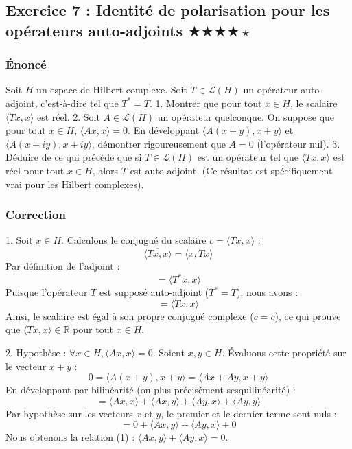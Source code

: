 \documentclass[11pt,a4paper]{article}
\begin{document}
\subsection*{Exercice 7 : Identité de polarisation pour les opérateurs auto-adjoints $\bigstar\bigstar\bigstar\bigstar\star$}
\subsubsection*{Énoncé}
Soit $H$ un espace de Hilbert complexe. Soit $T \in \mathcal{L}(H)$ un opérateur auto-adjoint, c'est-à-dire tel que $T^* = T$.
1. Montrer que pour tout $x \in H$, le scalaire $\langle Tx, x \rangle$ est réel.
2. Soit $A \in \mathcal{L}(H)$ un opérateur quelconque. On suppose que pour tout $x \in H$, $\langle Ax, x \rangle = 0$. En développant $\langle A(x+y), x+y \rangle$ et $\langle A(x+iy), x+iy \rangle$, démontrer rigoureusement que $A = 0$ (l'opérateur nul).
3. Déduire de ce qui précède que si $T \in \mathcal{L}(H)$ est un opérateur tel que $\langle Tx, x \rangle$ est réel pour tout $x \in H$, alors $T$ est auto-adjoint. (Ce résultat est spécifiquement vrai pour les Hilbert complexes).

\subsubsection*{Correction}
1. Soit $x \in H$. Calculons le conjugué du scalaire $c = \langle Tx, x \rangle$ :
$$ \overline{\langle Tx, x \rangle} = \langle x, Tx \rangle $$
Par définition de l'adjoint :
$$ = \langle T^*x, x \rangle $$
Puisque l'opérateur $T$ est supposé auto-adjoint ($T^* = T$), nous avons :
$$ = \langle Tx, x \rangle $$
Ainsi, le scalaire est égal à son propre conjugué complexe ($\overline{c} = c$), ce qui prouve que $\langle Tx, x \rangle \in \mathbb{R}$ pour tout $x \in H$.

2. Hypothèse : $\forall x \in H, \langle Ax, x \rangle = 0$.
Soient $x, y \in H$. Évaluons cette propriété sur le vecteur $x+y$ :
$$ 0 = \langle A(x+y), x+y \rangle = \langle Ax + Ay, x+y \rangle $$
En développant par bilinéarité (ou plus précisément sesquilinéarité) :
$$ = \langle Ax, x \rangle + \langle Ax, y \rangle + \langle Ay, x \rangle + \langle Ay, y \rangle $$
Par hypothèse sur les vecteurs $x$ et $y$, le premier et le dernier terme sont nuls :
$$ = 0 + \langle Ax, y \rangle + \langle Ay, x \rangle + 0 $$
Nous obtenons la relation (1) : $\langle Ax, y \rangle + \langle Ay, x \rangle = 0$.
\end{document}
